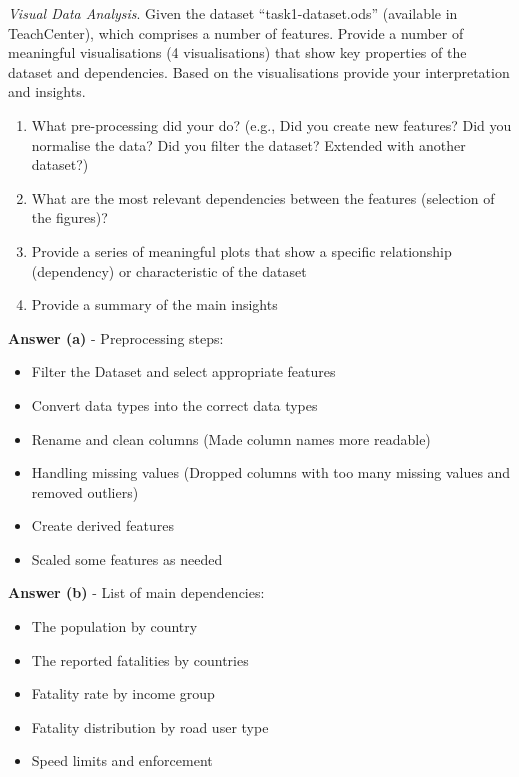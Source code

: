 \documentclass[a4paper,10pt]{article}\setlength{\textheight}{10in}\setlength{\textwidth}{6.5in}\setlength{\topmargin}{-0.125in}\setlength{\oddsidemargin}{-.2in}\setlength{\evensidemargin}{-.2in}\setlength{\headsep}{0.2in}\setlength{\footskip}{0pt}\usepackage{amsmath}\usepackage{fancyhdr}\usepackage{enumitem}\usepackage{hyperref}\usepackage{xcolor}\usepackage{graphicx}\usepackage[export]{adjustbox}\usepackage{caption}\usepackage{float}\usepackage{booktabs}\usepackage{makecell}\pagestyle{fancy}
\begin{document}
\begin{enumerate}[topsep=0mm, partopsep=0mm, leftmargin=*]





{\color{blue}
\item\textit{Visual Data Analysis}. Given the dataset ``task1-dataset.ods'' (available in TeachCenter), which comprises a number of features. Provide a number of meaningful visualisations (4 visualisations) that show key properties of the dataset and dependencies. Based on the visualisations provide your interpretation and insights. 
\begin{enumerate}
	\item What pre-processing did your do? (e.g., Did you create new features? Did you normalise the data? Did you filter the dataset? Extended with another dataset?)
	\item What are the most relevant dependencies between the features (selection of the figures)?
	\item Provide a series of meaningful plots that show a specific relationship (dependency) or characteristic of the dataset
	\item Provide a summary of the main insights
\end{enumerate}
}


\textbf{Answer (a)} - Preprocessing steps:
    \begin{itemize}
        \item Filter the Dataset and select appropriate features
        \item Convert data types into the correct data types
        \item Rename and clean columns (Made column names more readable)
        \item Handling missing values (Dropped columns with too many missing values and removed outliers)
        \item Create derived features
        \item Scaled some features as needed 
        
    \end{itemize}
    
\textbf{Answer (b)} - List of main dependencies:
    \begin{itemize}
        \item The population by country
        \item The reported fatalities by countries
        \item Fatality rate by income group
        \item Fatality distribution by road user type
        \item Speed limits and enforcement
    \end{itemize}
    

\end{enumerate}
\end{document}
